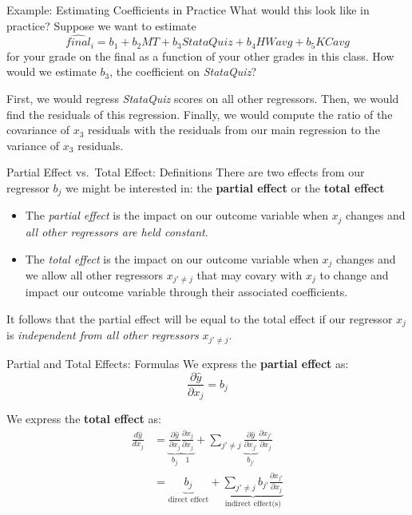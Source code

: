 \documentclass[
  ignorenonframetext,
  english,
]{beamer}
\begin{document}
\begin{frame}{Example: Estimating Coefficients in Practice}
\protect{}\label{example-estimating-coefficients-in-practice}
What would this look like in practice? Suppose we want to estimate
\[\widehat{final}_i=b_1+b_2MT+b_3StataQuiz+b_4HWavg+b_5KCavg\] for your
grade on the final as a function of your other grades in this class. How
would we estimate \(b_3\), the coefficient on \emph{StataQuiz}?

First, we would regress \emph{StataQuiz} scores on all other regressors.
Then, we would find the residuals of this regression. Finally, we would
compute the ratio of the covariance of \(x_3\) residuals with the
residuals from our main regression to the variance of \(x_3\) residuals.
\end{frame}

\begin{frame}{Partial Effect vs.~Total Effect: Definitions}
\protect{}\label{partial-effect-vs.-total-effect-definitions}
There are two effects from our regressor \(b_j\) we might be interested
in: the \textbf{partial effect} or the \textbf{total effect}

\begin{itemize}
\item
  The \emph{partial effect} is the impact on our outcome variable when
  \(x_j\) changes and \emph{all other regressors are held constant}.
\item
  The \emph{total effect} is the impact on our outcome variable when
  \(x_j\) changes and we allow all other regressors \(x_{j'\neq j}\)
  that may covary with \(x_j\) to change and impact our outcome variable
  through their associated coefficients.
\end{itemize}

It follows that the partial effect will be equal to the total effect if
our regressor \(x_j\) is \emph{independent from all other regressors}
\(x_{j'\neq j}\).
\end{frame}

\begin{frame}{Partial and Total Effects: Formulas}
\protect{}\label{partial-and-total-effects-formulas}
We express the \textbf{partial effect} as:
\[\frac{\partial\hat{y}}{\partial x_j}=b_j\]

We express the \textbf{total effect} as: \begin{align*}
\frac{d\hat{y}}{d x_j} &= \underbrace{\frac{\partial\hat{y}}{\partial x_j}}_{b_j}\underbrace{\frac{\partial x_j}{\partial x_j}}_1+\sum_{j'\neq j}\underbrace{\frac{\partial\hat{y}}{\partial x_{j'}}}_{b_{j'}}\frac{\partial x_{j'}}{\partial x_j} \\
&= \underbrace{b_j}_{\text{direct effect}}+\underbrace{\sum_{j'\neq j}b_{j'}\frac{\partial x_{j'}}{\partial x_j}}_{\text{indirect effect(s)}}
\end{align*}
\end{frame}
\end{document}
